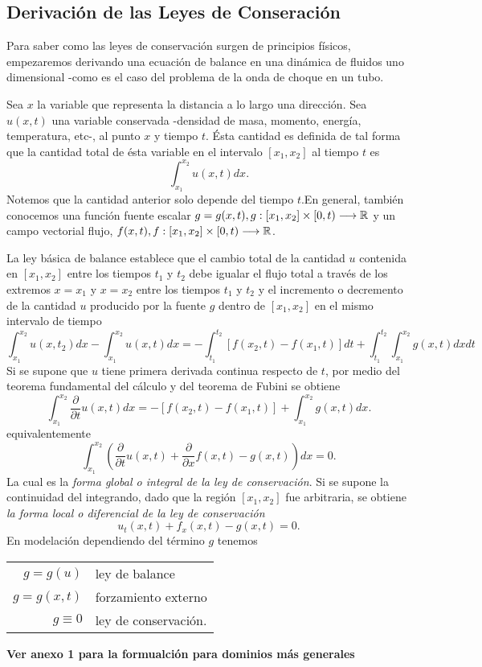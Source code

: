 \subsection{Derivación de las Leyes de Conseración}
Para saber como las leyes de conservación surgen de principios físicos, empezaremos derivando una ecuación de balance en una dinámica de fluidos uno dimensional -como es el caso del problema de la onda de choque en un tubo.

Sea $x$ la variable que representa la distancia a lo largo una dirección. Sea $u(x,t)$ una variable conservada -densidad de masa, momento, energía, temperatura, etc-, al punto $x$ y tiempo $t$. Ésta cantidad es definida de tal forma que la cantidad total de ésta variable en el intervalo $[x_1, x_2]$ al tiempo $t$ es
\[
\int_{x_1}^{x_2} u(x,t) dx.
\]
Notemos que la cantidad anterior solo depende del tiempo $t$.En general, también conocemos una función fuente escalar $g=g(x,t), g:[x_1, x_2] \times [0,t) \longrightarrow \operatorname{\mathbb R}$ y un campo vectorial flujo, $f(x,t), f:[x_1,x_2] \times [0,t) \longrightarrow \operatorname{\mathbb R}$.

La ley básica de balance establece que el cambio total de la cantidad $u$ contenida en $[x_1, x_2]$ entre los tiempos $t_1$ y $t_2$ debe igualar el flujo total a través de los extremos $x=x_1$ y $x=x_2$ entre los tiempos $t_1$ y $t_2$ y el incremento o decremento de la cantidad $u$ producido por la fuente $g$ dentro de $[x_1,x_2]$ en el mismo intervalo de tiempo
\[
\int_{x_1}^{x_2} u(x,t_2) dx - \int_{x_1}^{x_2} u(x,t) dx = - \int_{t_1}^{t_2} \left[ f(x_2,t) - f(x_1, t) \right] dt + \int_{t_1}^{t_2} \int_{x_1}^{x_2} g(x,t) dx dt
\]
Si se supone que $u$ tiene primera derivada continua respecto de $t$, por medio del teorema fundamental del cálculo y del teorema de Fubini se obtiene
\[
\int_{x_1}^{x_2} \frac{\partial}{\partial t} u(x,t) dx = - \left[ f(x_2,t) - f(x_1, t) \right] +  \int_{x_1}^{x_2} g(x,t) dx.
\]
equivalentemente
\[
\int_{x_1}^{x_2} \left( \frac{\partial}{\partial t} u(x,t) + \frac{\partial}{\partial x} f(x,t) - g(x,t) \right) dx = 0.
\]
La cual es la \textit{forma global o integral de la ley de conservación}. Si se supone la continuidad del integrando, dado que la región $[x_1,x_2]$ fue arbitraria, se obtiene \textit{la forma local o diferencial de la ley de conservación}
\[
u_t(x,t) +  f_x(x,t) - g(x,t) = 0.
\]
En modelación dependiendo del término $g$ tenemos
\begin{tabular}{r l}
$g = g(u)$ & ley de balance \\
$g = g(x,t)$ & forzamiento externo \\
$g \equiv 0$ & ley de conservación.
\end{tabular}
\textbf{Ver anexo 1 para la formualción para dominios más generales}

